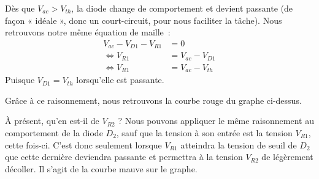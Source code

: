 \documentclass{../template/tp}
\begin{document}
{Dès que $V_{ac} > V_{th}$, la diode change de comportement et devient passante (de façon « idéale », donc un court-circuit, pour nous faciliter la tâche).
Nous retrouvons notre même équation de maille~:
\begin{align*}
V_{ac} - V_{D1} - V_{R1} &= 0 \\
\Leftrightarrow V_{R1} &= V_{ac} - V_{D1} \\
\Leftrightarrow V_{R1} &= V_{ac} - V_{th}
\end{align*}
Puisque $V_{D1} = V_{th}$ lorsqu'elle est passante.

Grâce à ce raisonnement, nous retrouvons la courbe rouge du graphe ci-dessus.

À présent, qu'en est-il de $V_{R2}$ ?
Nous pouvons appliquer le même raisonnement au comportement de la diode $D_2$, sauf que la tension à son entrée est la tension $V_{R1}$, cette fois-ci.
C'est donc seulement lorsque $V_{R1}$ atteindra la tension de seuil de $D_2$ que cette dernière deviendra passante et permettra à la tension $V_{R2}$ de légèrement décoller.
Il s'agit de la courbe mauve sur le graphe.

}


\end{document}
